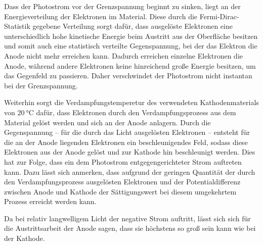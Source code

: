 Dass der Photostrom vor der Grenzspannung beginnt zu sinken, liegt an der Energieverteilung
der Elektronen im Material. Diese durch die Fermi-Dirac-Statistik gegebene Verteilung sorgt
dafür, dass ausgelöste Elektronen eine unterschiedlich hohe kinetische Energie beim Austritt
aus der Oberfläche besitzen und somit auch eine statistisch verteilte Gegenspannung, bei der
das Elektron die Anode nicht mehr erreichen kann. Dadurch erreichen einzelne Elektronen die
Anode, während andere Elektronen keine hinreichend große Energie besitzen, um das Gegenfeld
zu passieren. Daher verschwindet der Photostrom nicht instantan bei der Grenzspannung.

Weiterhin sorgt die Verdampfungstemperetur des verwendeten Kathodenmaterials von
$\SI{20}{\celsius}$ dafür, dass Elektronen durch den Verdampfungsprozess aus dem Material
gelöst werden und sich an der Anode anlagern. Durch die Gegenspannung -- für die durch das
Licht ausgelösten Elektronen -- entsteht für die an der Anode liegenden Elektronen
ein beschleunigendes Feld, sodass diese Elektronen aus der Anode gelöst und  zur Kathode
hin beschleunigt werden.
Dies hat zur Folge, dass ein dem Photostrom entgegengerichteter Strom auftreten kann.
Dazu lässt sich anmerken, dass aufgrund der geringen Quantität der durch den Verdampfungsprozess
ausgelösten Elektronen und der Potentialdifferenz zwischen Anode und Kathode der Sättigungswert
bei diesem umgekehrtem Prozess erreicht werden kann.

Da bei relativ langwelligem Licht der negative Strom auftritt, lässt sich sich für
die Austrittsarbeit der Anode sagen, dass sie höchstens so groß sein kann wie bei der
Kathode.
